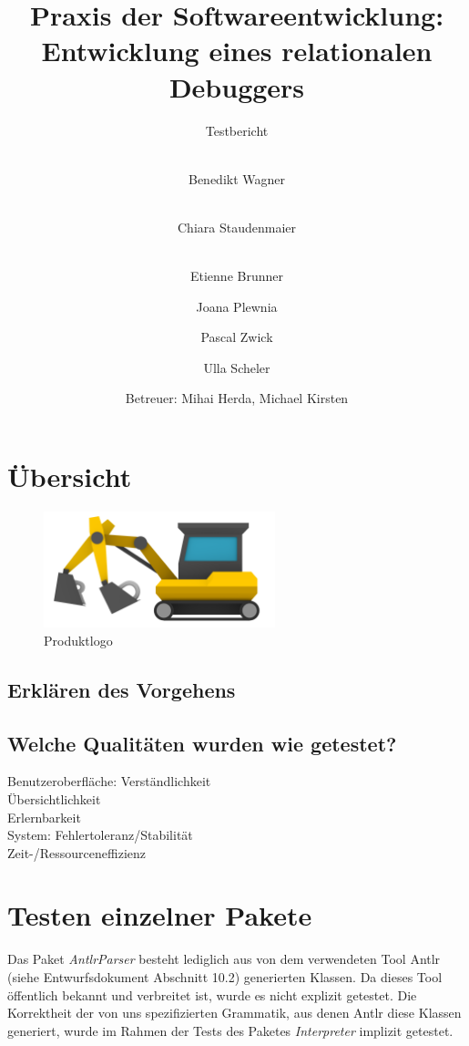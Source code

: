\documentclass[parskip=full]{scrartcl}
\title{
	\vspace{2cm}
	\myfont 
	Praxis der Softwareentwicklung:\\ 
	Entwicklung eines relationalen Debuggers\\
}
\subtitle{
	\vspace{1cm}
	\myfont
	Testbericht
}
\author{
	\vspace{1cm} \\
	Benedikt Wagner\\
	\and 
        \vspace{1cm} \\ 
        Chiara Staudenmaier\\
        \and 
        \vspace{1cm} \\
        Etienne Brunner\\
	\and Joana Plewnia\\
	\and Pascal Zwick\\
	\and Ulla Scheler\\
	\vspace{1cm}
	\and Betreuer: Mihai Herda, Michael Kirsten
	\vspace{4cm}
}
\begin{document}
\clearpage
\maketitle
{}
\newpage

\tableofcontents
\newpage
{}

\section{Übersicht}

\begin{figure}[!h]
\centering
\includegraphics[width=0.6\textwidth]{../Plichtenheft/logo_nongi.png}
\caption{Produktlogo}
\end{figure}

\subsection{Erklären des Vorgehens}
\subsection{Welche Qualitäten wurden wie getestet?}

Benutzeroberfläche:
Verständlichkeit \\
Übersichtlichkeit \\
Erlernbarkeit \\

System:
Fehlertoleranz/Stabilität \\
Zeit-/Ressourceneffizienz \\


\section{Testen einzelner Pakete}
Das Paket \textit{AntlrParser} besteht lediglich aus von dem verwendeten Tool Antlr (siehe Entwurfsdokument Abschnitt 10.2) generierten Klassen. Da dieses Tool öffentlich bekannt und verbreitet ist, wurde es nicht explizit getestet. Die Korrektheit der von uns spezifizierten Grammatik, aus denen Antlr diese Klassen generiert, wurde im Rahmen der Tests des Paketes \textit{Interpreter} implizit getestet.
\end{document}
